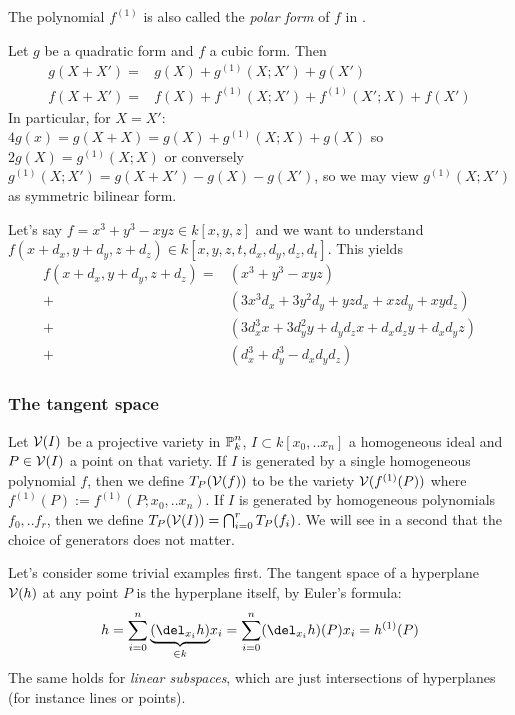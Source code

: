 \begin{remark}
The polynomial $f^{(1)}$ is also called the \emph{polar form} of $f$ in \cite[p. 104]{reid1988undergraduate}.
\end{remark}

\begin{corollary} \label{corollaryTaylorForQuadricAndCubic}
Let $g$ be a quadratic form and $f$ a cubic form. Then
\begin{align}
g(X+X') =& g(X) + g^{(1)}(X;X') + g(X')
\\ f(X+X') =& f(X) + f^{(1)}(X;X') + f^{(1)}(X';X) + f(X')
\end{align}
In particular, for $X=X'$: $4g(x) = g(X+X) = g(X) + g^{(1)}(X;X) + g(X)$ so $2g(X) = g^{(1)}(X;X)$ or conversely $g^{(1)}(X;X') = g(X+X') - g(X) - g(X')$, so we may view $g^{(1)}(X;X')$ as symmetric bilinear form.
\end{corollary}

\begin{example}
Let's say $f = x^3 + y^3 - xyz \in k[x,y,z]$ and we want to understand $f(x+d_x,y+d_y,z+d_z) \in k[x,y,z,t,d_x,d_y,d_z,d_t]$.
This yields
\begin{align*}
f(x+d_x,y+d_y,z+d_z)
  =& (x^3 + y^3 - xyz)
\\+& (3x^3d_x + 3y^2d_y + yzd_x + xzd_y + xyd_z)
\\+& (3d_x^3x + 3d_y^2y + d_yd_zx + d_xd_zy+d_xd_yz)
\\+& (d_x^3 + d_y^3 - d_xd_yd_z)
\end{align*}
\end{example}


\subsubsection{The tangent space}

\begin{definition} \label{definitionTangentSpace}
Let $\operatorname{\mathcal V}(I)$ be a projective variety in $\operatorname{\mathbb P}^n_k$, $I \subset k[x_0,..x_n]$ a homogeneous ideal and $P\in \operatorname{\mathcal V}(I)$ a point on that variety.
If $I$ is generated by a single homogeneous polynomial $f$, then we define $T_P(\operatorname{\mathcal V}(f))$ to be the variety $\operatorname{\mathcal V}(f^{(1)}(P))$ where $f^{(1)}(P) := f^{(1)}(P;x_0,..x_n)$.
If $I$ is generated by homogeneous polynomials $f_0,..f_r$, then we define $T_P(\operatorname{\mathcal V}(I)) = \bigcap_{i=0}^r T_P(f_i)$.
We will see in a second that the choice of generators does not matter.
\end{definition}

\begin{example} \label{exampleTangentPlaneOfLinearSubsets}
Let's consider some trivial examples first.
The tangent space of a hyperplane $\operatorname{\mathcal V}(h)$ at any point $P$ is the hyperplane itself, by Euler's formula:
\begin{equation}
h = \sum_{i=0}^n \underset{\in k}{\underbrace{(\del_{x_i}h)}}x_i = \sum_{i=0}^n (\del_{x_i}h)(P) x_i = h^{(1)}(P)
\end{equation}
The same holds for \emph{linear subspaces}, which are just intersections of hyperplanes (for instance lines or points).
\end{example}

